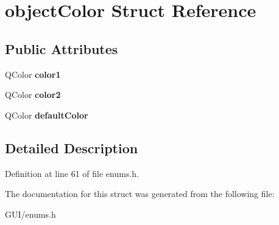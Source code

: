 \hypertarget{structobject_color}{}\section{object\+Color Struct Reference}
\label{structobject_color}
\subsection*{Public Attributes}
\begin{DoxyCompactItemize}
\item 
\mbox{\label{structobject_color_a622e9b34bf2ff2497b875ac3b521c2e0}} 
Q\+Color {\bfseries color1}
\item 
\mbox{\label{structobject_color_a82d7443b5c77035dffddec97dc48b3e2}} 
Q\+Color {\bfseries color2}
\item 
\mbox{\label{structobject_color_ab2e020711e9227438237f8c3010a5490}} 
Q\+Color {\bfseries default\+Color}
\end{DoxyCompactItemize}


\subsection{Detailed Description}


Definition at line 61 of file enums.\+h.



The documentation for this struct was generated from the following file\+:\begin{DoxyCompactItemize}
\item 
G\+U\+I/enums.\+h\end{DoxyCompactItemize}
